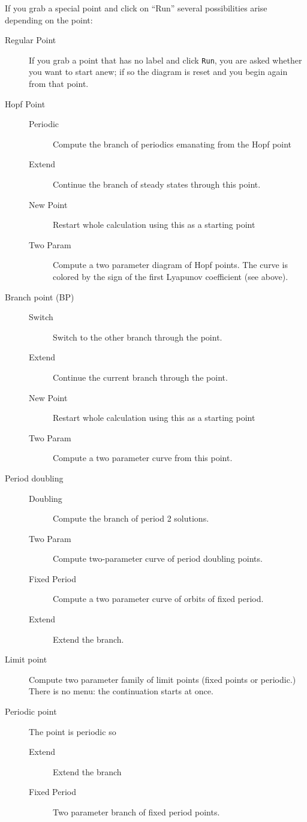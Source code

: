 \documentclass{article}
\begin{document}
If you grab a special point and click on ``Run'' several possibilities
arise depending on the point:
\begin{description}
\item[Regular Point] If you grab a point that has no label and click
{\tt Run}, you are asked whether you want to start anew; if so the
diagram is reset and you begin again from that point.
\item[Hopf Point]
\begin{description}
	\item[Periodic] Compute the branch of periodics emanating from
the Hopf point
	\item[Extend] Continue the branch of steady states through
this point.
	\item[New Point] Restart whole calculation using this as a
starting point
	\item[Two Param] Compute a two parameter diagram of Hopf
points.  The curve is colored by the sign of the first Lyapunov
coefficient (see above).
	\end{description}
\item[Branch point (BP)]
	\begin{description}
	\item[Switch] Switch to the other branch through the point.
	\item[Extend] Continue the current branch through the point.
	\item[New Point] Restart whole calculation using this as a
starting point
	\item[Two Param] Compute a two parameter curve from this point.
	\end{description}
\item[Period doubling]
	\begin{description}
	\item[Doubling] Compute the branch of period 2 solutions.
	\item[Two Param]  Compute two-parameter curve of period
doubling points.
	\item[Fixed Period] Compute a two parameter curve of orbits of fixed period.
	\item[Extend] Extend the branch.
	\end{description}

\item[Limit point] Compute two parameter family of limit points (fixed
points or periodic.)  There is no menu: the continuation starts at once.
\item[Periodic point] The point is periodic so
	\begin{description}
	\item[Extend] Extend the branch
	\item[Fixed Period] Two parameter branch of fixed period
points.
	\end{description}


\end{description}
\end{document}
